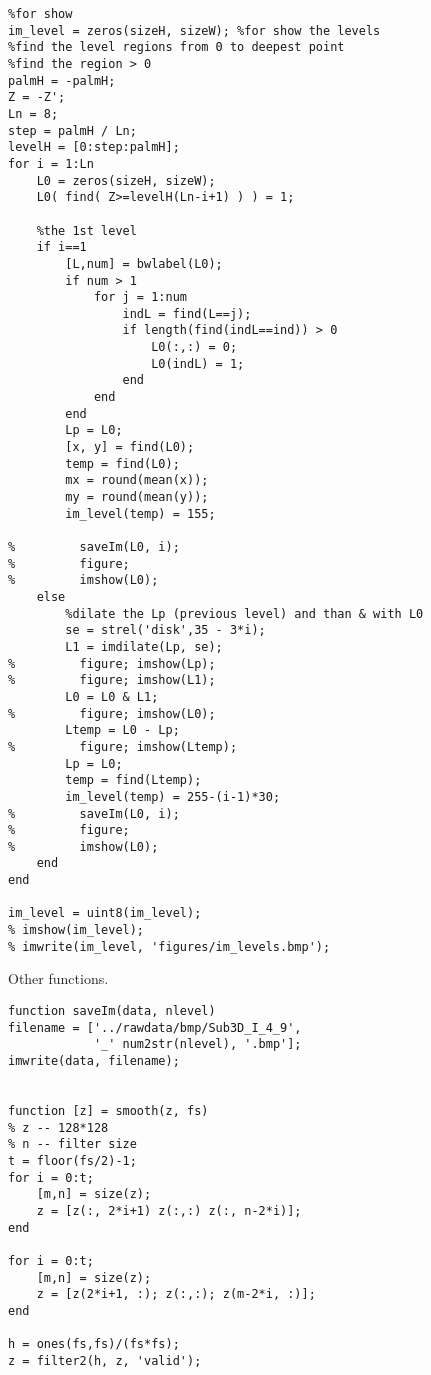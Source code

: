 \begin{verbatim}
%for show
im_level = zeros(sizeH, sizeW); %for show the levels
%find the level regions from 0 to deepest point 
%find the region > 0
palmH = -palmH;
Z = -Z';
Ln = 8;
step = palmH / Ln;
levelH = [0:step:palmH];
for i = 1:Ln
    L0 = zeros(sizeH, sizeW);
    L0( find( Z>=levelH(Ln-i+1) ) ) = 1;

    %the 1st level
    if i==1
        [L,num] = bwlabel(L0);
        if num > 1
            for j = 1:num
                indL = find(L==j);
                if length(find(indL==ind)) > 0
                    L0(:,:) = 0;
                    L0(indL) = 1;
                end
            end
        end
        Lp = L0;
        [x, y] = find(L0);
        temp = find(L0);
        mx = round(mean(x));
        my = round(mean(y));
        im_level(temp) = 155;

%         saveIm(L0, i);
%         figure;
%         imshow(L0);
    else
        %dilate the Lp (previous level) and than & with L0
        se = strel('disk',35 - 3*i);  
        L1 = imdilate(Lp, se);
%         figure; imshow(Lp);
%         figure; imshow(L1);
        L0 = L0 & L1;
%         figure; imshow(L0);
        Ltemp = L0 - Lp;
%         figure; imshow(Ltemp);
        Lp = L0; 
        temp = find(Ltemp);
        im_level(temp) = 255-(i-1)*30;
%         saveIm(L0, i);
%         figure;
%         imshow(L0);
    end    
end

im_level = uint8(im_level);
% imshow(im_level);
% imwrite(im_level, 'figures/im_levels.bmp');
\end{verbatim}
\clearpage

Other functions.

\begin{verbatim}
function saveIm(data, nlevel)
filename = ['../rawdata/bmp/Sub3D_I_4_9', 
			'_' num2str(nlevel), '.bmp'];
imwrite(data, filename);


function [z] = smooth(z, fs)
% z -- 128*128
% n -- filter size
t = floor(fs/2)-1;
for i = 0:t;
    [m,n] = size(z);
    z = [z(:, 2*i+1) z(:,:) z(:, n-2*i)];
end

for i = 0:t;
    [m,n] = size(z);
    z = [z(2*i+1, :); z(:,:); z(m-2*i, :)];
end

h = ones(fs,fs)/(fs*fs);
z = filter2(h, z, 'valid');
\end{verbatim}
\clearpage